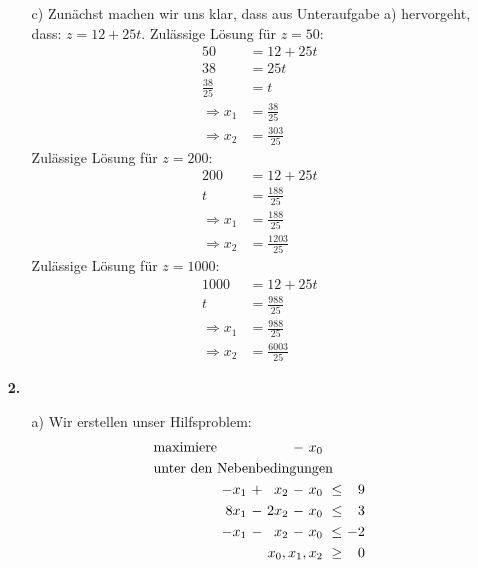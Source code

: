 \documentclass [a4paper,11pt]{article}
\begin{document}
\begin{enumerate}
\begin{enumerate}
            \item[c)]
            Zunächst machen wir uns klar, dass aus Unteraufgabe a) hervorgeht, dass: $z = 12 + 25t$.
            Zulässige Lösung für $z = 50$:
            \begin{align*}
                50 &= 12 + 25t\\
                38 &= 25t\\
                \frac{38}{25} &= t\\
                \Rightarrow
                    x_1 &= \frac{38}{25}\\
                \Rightarrow
                    x_2 &= \frac{303}{25}
            \end{align*}
            Zulässige Lösung für $z = 200$:
            \begin{align*}
                200 &= 12 + 25t\\
                t &= \frac{188}{25}\\
                \Rightarrow x_1 &= \frac{188}{25}\\
                \Rightarrow x_2 &= \frac{1203}{25}
            \end{align*}
            Zulässige Lösung für $z = 1000$:
            \begin{align*}
                1000 &= 12 + 25t\\
                t &= \frac{988}{25}\\
                \Rightarrow x_1 &= \frac{988}{25}\\
                \Rightarrow x_2 &= \frac{6003}{25}
            \end{align*}
        \end{enumerate}
        \item[\textbf{2.}]
        \begin{enumerate}
            \item[a)]
            Wir erstellen unser Hilfsproblem:
            \begin{align*}
            \begin{alignedat}{5}
            & \text{maximiere } & & & &\ - &\ x_0 & & \\
            & \rlap{unter den Nebenbedingungen} & & & & & & & \\
            && -x_1 &\ + &\  x_2 &\ - &\ x_0 &\ \leq &\  9 \\
            && 8x_1 &\ - &\ 2x_2 &\ - &\ x_0 &\ \leq &\  3 \\
            && -x_1 &\ - &\  x_2 &\ - &\ x_0 &\ \leq &\ -2 \\
            && & & & & \llap{$x_0, x_1, x_2$} &\ \geq &\ 0 
            \end{alignedat}
            \end{align*}


\end{enumerate}
\end{enumerate}
\end{document}
